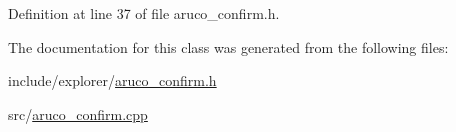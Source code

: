 Definition at line 37 of file aruco\+\_\+confirm.\+h.



The documentation for this class was generated from the following files\+:\begin{DoxyCompactItemize}
\item 
include/explorer/\hyperlink{aruco__confirm_8h}{aruco\+\_\+confirm.\+h}\item 
src/\hyperlink{aruco__confirm_8cpp}{aruco\+\_\+confirm.\+cpp}\end{DoxyCompactItemize}
